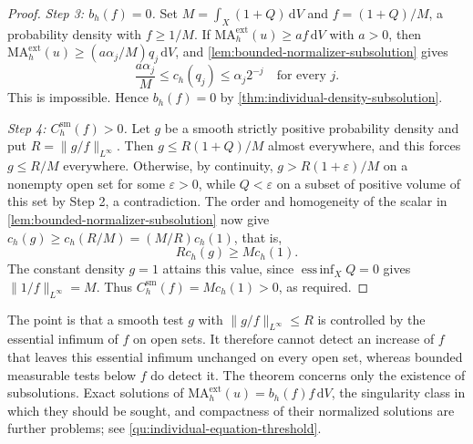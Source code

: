 \begin{proof}
\emph{Step 3: $b_h(f)=0$.} Set $M=\int_X(1+Q)\,\mathrm{d}V$ and $f=(1+Q)/M$, a probability density with $f\geq1/M$. If $\mathrm{MA}^{\mathrm{ext}}_h(u)\geq af\,\mathrm{d}V$ with $a>0$, then $\mathrm{MA}^{\mathrm{ext}}_h(u)\geq(a\alpha_j/M)q_j\,\mathrm{d}V$, and \cref{lem:bounded-normalizer-subsolution} gives
\[
 \frac{a\alpha_j}{M}\leq c_h(q_j)\leq\alpha_j2^{-j}
 \quad\text{for every }j.
\]
This is impossible. Hence $b_h(f)=0$ by \cref{thm:individual-density-subsolution}.

\emph{Step 4: $C_h^{\mathrm{sm}}(f)>0$.} Let $g$ be a smooth strictly positive probability density and put $R=\|g/f\|_{L^\infty}$. Then $g\leq R(1+Q)/M$ almost everywhere, and this forces $g\leq R/M$ everywhere. Otherwise, by continuity, $g>R(1+\varepsilon)/M$ on a nonempty open set for some $\varepsilon>0$, while $Q<\varepsilon$ on a subset of positive volume of this set by Step 2, a contradiction. The order and homogeneity of the scalar in \cref{lem:bounded-normalizer-subsolution} now give $c_h(g)\geq c_h(R/M)=(M/R)c_h(1)$, that is,
\[
 R c_h(g)\geq M c_h(1).
\]
The constant density $g=1$ attains this value, since $\operatorname*{ess\,inf}_XQ=0$ gives $\|1/f\|_{L^\infty}=M$. Thus
$C_h^{\mathrm{sm}}(f)=M c_h(1)>0$, as required.
\end{proof}

The point is that a smooth test $g$ with $\|g/f\|_{L^\infty}\leq R$ is controlled by the essential infimum of $f$ on open sets. It therefore cannot detect an increase of $f$ that leaves this essential infimum unchanged on every open set, whereas bounded measurable tests below $f$ do detect it. The theorem concerns only the existence of subsolutions. Exact solutions of $\mathrm{MA}^{\mathrm{ext}}_h(u)=b_h(f)f\,\mathrm{d}V$, the singularity class in which they should be sought, and compactness of their normalized solutions are further problems; see \cref{qu:individual-equation-threshold}.
